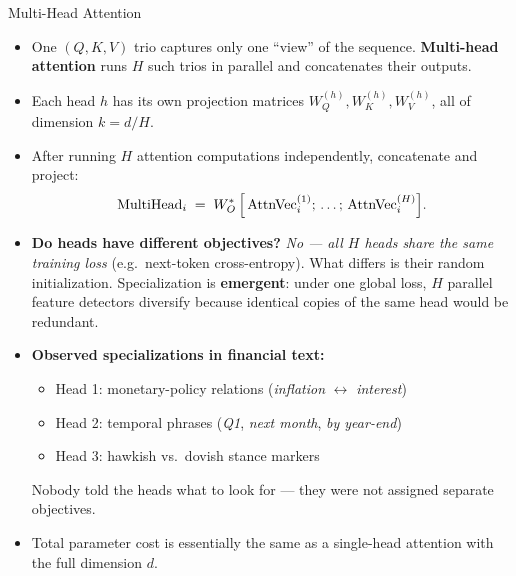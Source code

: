 \begin{frame}{Multi-Head Attention}
\small
\begin{itemize}
\item One $(Q, K, V)$ trio captures only one ``view'' of the sequence. \textbf{Multi-head attention} runs $H$ such trios in parallel and concatenates their outputs.

\medskip
\item Each head $h$ has its own projection matrices $W_{Q}^{(h)}, W_{K}^{(h)}, W_{V}^{(h)}$, all of dimension $k = d/H$.

\medskip
\item After running $H$ attention computations independently, concatenate and project:
\[
   \text{MultiHead}_{i} \;=\; W_{O}^{*}\,\Bigl[\,\text{AttnVec}_{i}^{(1)};\,\ldots;\,\text{AttnVec}_{i}^{(H)}\Bigr].
\]

\medskip
\item \textbf{Do heads have different objectives?} \emph{No --- all $H$ heads share the same training loss} (e.g.\ next-token cross-entropy). What differs is their random initialization. Specialization is \textbf{emergent}: under one global loss, $H$ parallel feature detectors diversify because identical copies of the same head would be redundant.

\medskip
\item \textbf{Observed specializations in financial text:}
\begin{itemize}
    \item Head 1: monetary-policy relations (\emph{inflation} $\leftrightarrow$ \emph{interest})
    \item Head 2: temporal phrases (\emph{Q1}, \emph{next month}, \emph{by year-end})
    \item Head 3: hawkish vs.\ dovish stance markers
\end{itemize}
Nobody told the heads what to look for --- they were not assigned separate objectives.

\medskip
\item Total parameter cost is essentially the same as a single-head attention with the full dimension $d$.
\end{itemize}
\end{frame}

